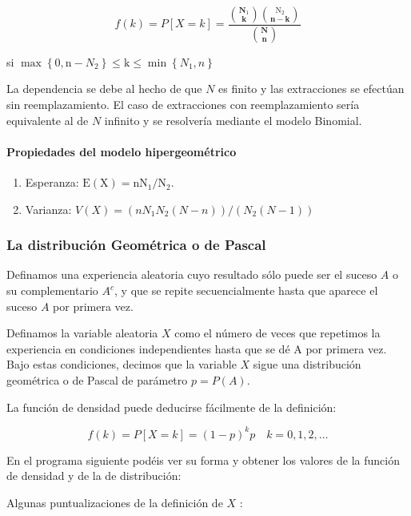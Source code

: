 \documentclass[
]{article}
\begin{document}
\[
f(k)=P[X=k]=\frac{\binom{\mathbf{N}_{1}}{\mathbf{k}}\binom{\mathrm{N}_{2}}{\mathbf{n}-\mathbf{k}}}{\binom{\mathbf{N}}{\mathbf{n}}}
\]

si \(\operatorname{max}\left\{0, \mathrm{n}-N_{2}\right\} \leq \mathrm{k} \leq \min \left\{N_{1}, n\right\}\)

La dependencia se debe al hecho de que \(N\) es finito y las extracciones se efectúan sin reemplazamiento. El caso de extracciones con reemplazamiento sería equivalente al de \(N\) infinito y se resolvería mediante el modelo Binomial.

\paragraph{Propiedades del modelo hipergeométrico}\label{propiedades-del-modelo-hipergeomuxe9trico}

\begin{enumerate}
\def\labelenumi{\arabic{enumi}.}
\item
  Esperanza: \(\mathrm{E}(\mathrm{X})=\mathrm{n} \mathrm{N}_{1} / \mathrm{N}_{2}\).
\item
  Varianza: \(V(X)=\left(n N_{1} N_{2}(N-n)\right) /\left(N_{2}(N-1)\right)\)
\end{enumerate}

\subsubsection{La distribución Geométrica o de Pascal}\label{la-distribuciuxf3n-geomuxe9trica-o-de-pascal}

Definamos una experiencia aleatoria cuyo resultado sólo puede ser el suceso \(A\) o su complementario \(A^{c}\), y que se repite secuencialmente hasta que aparece el suceso \(A\) por primera vez.

Definamos la variable aleatoria \(X\) como el número de veces que repetimos la experiencia en condiciones independientes hasta que se dé A por primera vez. Bajo estas condiciones, decimos que la variable \(X\) sigue una distribución geométrica o de Pascal de parámetro \(p=P(A)\).

La función de densidad puede deducirse fácilmente de la definición:

\[
f(k)=P[X=k]=(1-p)^{k} p \quad k=0,1,2, \ldots
\]

En el programa siguiente podéis ver su forma y obtener los valores de la función de densidad y de la de distribución:

Algunas puntualizaciones de la definición de \(X\) :
\end{document}
